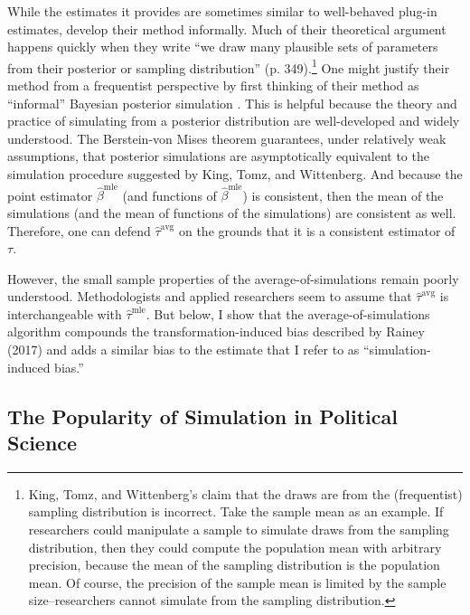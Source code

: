 \documentclass[12pt]{article}
\begin{document}
While the estimates it provides are sometimes similar to well-behaved plug-in estimates, \cite{KingTomzWittenberg2000} develop their method informally. 
Much of their theoretical argument happens quickly when they write ``we draw many plausible sets of parameters from their posterior or sampling distribution'' (p. 349).\footnote{King, Tomz, and Wittenberg's claim that the draws are from the (frequentist) sampling distribution is incorrect. Take the sample mean as an example. If researchers could manipulate a sample to simulate draws from the sampling distribution, then they could compute the population mean with arbitrary precision, because the mean of the sampling distribution is the population mean. Of course, the precision of the sample mean is limited by the sample size--researchers cannot simulate from the sampling distribution.}
One might justify their method from a frequentist perspective by first thinking of their method as ``informal'' Bayesian posterior simulation \citep{GelmanHill2006}.  
This is helpful because the theory and practice of simulating from a posterior distribution are well-developed and widely understood. 
The Berstein-von Mises theorem \citep[pp.\@ 140-146]{vanderVaart2000} guarantees, under relatively weak assumptions, that posterior simulations are asymptotically equivalent to the simulation procedure suggested by King, Tomz, and Wittenberg. And because the point estimator $\hat{\beta}^{\text{mle}}$ (and functions of $\hat{\beta}^{\text{mle}}$) is consistent, then the mean of the simulations (and the mean of functions of the simulations) are consistent as well. Therefore, one can defend $\hat{\tau}^{\text{avg}}$ on the grounds that it is a consistent estimator of $\tau$. 

However, the small sample properties of the average-of-simulations remain poorly understood. Methodologists and applied researchers seem to assume that $\hat{\tau}^{\text{avg}}$ is interchangeable with  $\hat{\tau}^{\text{mle}}$. 
But below, I show that the average-of-simulations algorithm compounds the transformation-induced bias described by Rainey (2017) and adds a similar bias to the estimate that I refer to as ``simulation-induced bias.'' 

\subsection*{The Popularity of Simulation in Political Science}
\end{document}
